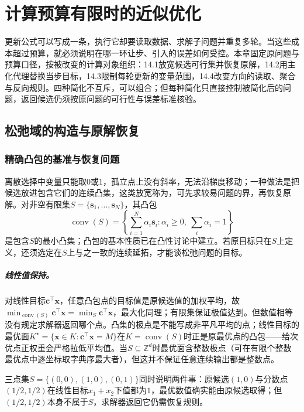 \chapter{计算预算有限时的近似优化}
\label{chap:approximate-optimization}

更新公式可以写成一条，执行它却要读取数据、求解子问题并重复多轮。当这些成本超过预算，就必须说明在哪一环让步、引入的误差如何受控。本章固定原问题与预算口径，按被改变的计算对象组织：14.1放宽候选可行集并恢复原解，14.2用主化代理替换当步目标，14.3限制每轮更新的变量范围，14.4改变方向的读取、聚合与反向规则。四种简化不互斥，可以组合；但每种简化只直接控制被简化后的问题，返回候选仍须按原问题的可行性与误差标准核验。

\section{松弛域的构造与原解恢复}

\subsection{精确凸包的基准与恢复问题}

离散选择中变量只能取$0$或$1$，孤立点上没有斜率，无法沿梯度移动；一种做法是把候选放进包含它们的连续凸集，这类放宽称为，可先求较易问题的界，再恢复原解。对非空有限集$S=\{\bm s_1,\ldots,\bm s_N\}$，其凸包
\[
 \operatorname{conv}(S)
 =\left\{\sum_{i=1}^N\alpha_i\bm s_i:
 \alpha_i\geq0,\ \sum_i\alpha_i=1\right\}
\]
是包含$S$的最小凸集；凸包的基本性质已在凸性讨论中建立。若原目标只在$S$上定义，还须选定在$S$上与之一致的连续延拓，才能谈松弛问题的目标。

\paragraph{线性值保持。}
对线性目标$\bm c^\top\bm x$，任意凸包点的目标值是原候选值的加权平均，故$\min_{\operatorname{conv}(S)}\bm c^\top\bm x=\min_S\bm c^\top\bm x$，最大化同理；有限集保证极值达到。但数值相等没有规定求解器返回哪个点。凸集的极点是不能写成非平凡平均的点；线性目标的最优面$K^\star=\{\bm x\in K:\bm c^\top\bm x=M\}$在$K=\operatorname{conv}(S)$时正是原最优点的凸包——给次优点正权重会严格拉低平均值。当$S\subseteq\mathbb Z^d$时最优面含整数极点（可在有限个整数最优点中逐坐标取字典序最大者），但这并不保证任意连续输出都是整数点。

三点集$S=\{(0,0),(1,0),(0,1)\}$同时说明两件事：原候选$(1,0)$与分数点$(1/2,1/2)$在线性目标$x_1+x_2$下值都为$1$，最优数值确实能由原候选取得；但$(1/2,1/2)$本身不属于$S$，求解器返回它仍需恢复规则。

